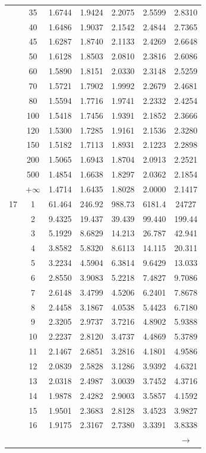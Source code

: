 \begin{minipage}{0.49\textwidth}
\begin{center}
\begin{tabular}{ccccccc}
			& 35 & 1.6744 & 1.9424 & 2.2075 & 2.5599 & 2.8310 \\
			& 40 & 1.6486 & 1.9037 & 2.1542 & 2.4844 & 2.7365 \\
			& 45 & 1.6287 & 1.8740 & 2.1133 & 2.4269 & 2.6648 \\[5pt]
			& 50 & 1.6128 & 1.8503 & 2.0810 & 2.3816 & 2.6086 \\
			& 60 & 1.5890 & 1.8151 & 2.0330 & 2.3148 & 2.5259 \\
			& 70 & 1.5721 & 1.7902 & 1.9992 & 2.2679 & 2.4681 \\
			& 80 & 1.5594 & 1.7716 & 1.9741 & 2.2332 & 2.4254 \\
			& 100 & 1.5418 & 1.7456 & 1.9391 & 2.1852 & 2.3666 \\
			& 120 & 1.5300 & 1.7285 & 1.9161 & 2.1536 & 2.3280 \\
			& 150 & 1.5182 & 1.7113 & 1.8931 & 2.1223 & 2.2898 \\
			& 200 & 1.5065 & 1.6943 & 1.8704 & 2.0913 & 2.2521 \\
			& 500 & 1.4854 & 1.6638 & 1.8297 & 2.0362 & 2.1854 \\
			& $+\infty$ & 1.4714 & 1.6435 & 1.8028 & 2.0000 & 2.1417 \\
			\midrule
			17 & 1 & 61.464 & 246.92 & 988.73 & 6181.4 & 24727 \\
			& 2 & 9.4325 & 19.437 & 39.439 & 99.440 & 199.44 \\
			& 3 & 5.1929 & 8.6829 & 14.213 & 26.787 & 42.941 \\
			& 4 & 3.8582 & 5.8320 & 8.6113 & 14.115 & 20.311 \\
			& 5 & 3.2234 & 4.5904 & 6.3814 & 9.6429 & 13.033 \\
			& 6 & 2.8550 & 3.9083 & 5.2218 & 7.4827 & 9.7086 \\
			& 7 & 2.6148 & 3.4799 & 4.5206 & 6.2401 & 7.8678 \\
			& 8 & 2.4458 & 3.1867 & 4.0538 & 5.4423 & 6.7180 \\
			& 9 & 2.3205 & 2.9737 & 3.7216 & 4.8902 & 5.9388 \\[5pt]
			& 10 & 2.2237 & 2.8120 & 3.4737 & 4.4869 & 5.3789 \\
			& 11 & 2.1467 & 2.6851 & 3.2816 & 4.1801 & 4.9586 \\
			& 12 & 2.0839 & 2.5828 & 3.1286 & 3.9392 & 4.6321 \\
			& 13 & 2.0318 & 2.4987 & 3.0039 & 3.7452 & 4.3716 \\
			& 14 & 1.9878 & 2.4282 & 2.9003 & 3.5857 & 4.1592 \\
			& 15 & 1.9501 & 2.3683 & 2.8128 & 3.4523 & 3.9827 \\
			& 16 & 1.9175 & 2.3167 & 2.7380 & 3.3391 & 3.8338 \\
			&  &  &  &  &  & $\rightarrow$ \\
		\end{tabular}
	\end{center}
\end{minipage}
